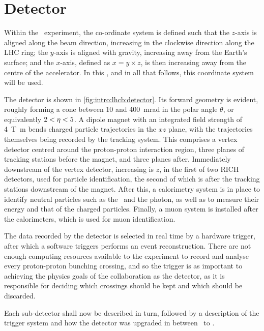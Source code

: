 \section{Detector}
\label{chap:intro:lhcb:detector}

Within the \lhcb\ experiment, the co-ordinate system is defined such that the 
$z$-axis is aligned along the beam direction, increasing in the clockwise 
direction along the \ac{LHC} ring; the $y$-axis is aligned with gravity, 
increasing away from the Earth's surface; and the $x$-axis, defined as $x = y 
\times z$, is then increasing away from the centre of the accelerator.
In this , and in all that follows, this 
coordinate system will be used.

The detector is shown in \cref{fig:intro:lhcb:detector}.
Its forward geometry is evident, roughly forming a cone between 10 and 
\SI{400}{\milli\radian} in the polar angle $\theta$, or equivalently $2 < \eta 
< 5$.
A dipole magnet with an integrated field strength of \SI{4}{\tesla\metre} bends 
charged particle trajectories in the $xz$ plane, with the trajectories 
themselves being recorded by the tracking system.
This comprises a vertex detector centred around the proton-proton interaction 
region, three planes of tracking stations before the magnet, and three planes 
after.
Immediately downstream of the vertex detector, increasing is $z$, in the first 
of two \ac{RICH} detectors, used for particle identification, the second of 
which is after the tracking stations downstream of the magnet.
After this, a calorimetry system is in place to identify neutral particles such 
as the \Ppizero\ and the photon, as well as to measure their energy and that of 
the charged particles.
Finally, a muon system is installed after the calorimeters, which is used for 
muon identification.

The data recorded by the detector is selected in real time by a hardware 
trigger, after which a software triggers performs an event reconstruction.
There are not enough computing resources available to the experiment to record 
and analyse every proton-proton bunching crossing, and so the trigger is as 
important to achieving the physics goals of the collaboration as the detector, 
as it is responsible for deciding which crossings should be kept and which 
should be discarded.

Each sub-detector shall now be described in turn, followed by a description of 
the trigger system and how the detector was upgraded in between \runone\ to 
\runtwo.

